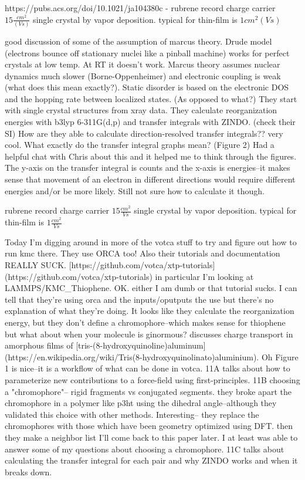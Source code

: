 \documentclass{article}
\begin{document}
https://pubs.acs.org/doi/10.1021/ja104380c - 
rubrene record charge carrier $15 \frac{cm^{2}}{(V s)}$ single crystal by vapor deposition. typical for thin-film is $1 {cm^{2}}{(V s)}$

good discussion of some of the assumption of marcus theory. 
Drude model (electrons bounce off stationary nuclei like a pinball machine) works for perfect crystals at low temp.
At RT it doesn't work. Marcus theory assumes nuclear dynamics much slower (Borne-Oppenheimer) and electronic coupling is weak (what does this mean exactly?). Static disorder is based on the electronic DOS and the hopping rate between localized states. (As opposed to what?)
They start with single crystal structures from xray data. They calculate reorganization energies with b3lyp 6-311G(d,p) and transfer integrals with ZINDO. (check their SI)
How are they able to calculate direction-resolved transfer integrals?? very cool. What exactly do the transfer integral graphs mean? (Figure 2) Had a helpful chat with Chris about this and it helped me to think through the figures. The y-axis on the transfer integral is counts and the x-axis is energies--it makes sense that movement of an electron in different directions would require different energies and/or be more likely. Still not sure how to calculate it though. 

\cite{Vehoff2010a}
rubrene record charge carrier $15 \frac{cm^{2}}{V s}$ single crystal by vapor deposition. typical for thin-film is $1 \frac{cm^{2}}{V s}$

Today I'm digging around in more of the votca stuff to try and figure out how to run kmc there. They use ORCA too! Also their tutorials and documentation REALLY SUCK. [https://github.com/votca/xtp-tutorials](https://github.com/votca/xtp-tutorials) in particular I'm looking at LAMMPS/KMC\_Thiophene.
OK. either I am dumb or that tutorial sucks. I can tell that they're using orca and the inputs/oputputs the use but there's no explanation of what they're doing. It looks like they calculate the reorganization energy, but they don't define a chromophore--which makes sense for thiophene but what about when your molecule is ginormous?
\cite{Ruhle2011b} discusses charge transport in amorphous films of [tris-(8-hydroxyquinoline)aluminum](https://en.wikipedia.org/wiki/Tris(8-hydroxyquinolinato)aluminium). Oh Figure 1 is nice--it is a workflow of what can be done in votca.
11A talks about how to parameterize new contributions to a force-field using first-principles.
11B choosing a "chromophore"-- rigid fragments vs conjugated segments. they broke apart the chromophore in a polymer like p3ht using the dihedral angle--although they validated this choice with other methods. Interesting-- they replace the chromophores with those which have been geometry optimized using DFT. then they make a neighbor list
I'll come back to this paper later. I at least was able to answer some of my questions about choosing a chromophore.
11C talks about calculating the transfer integral for each pair and why ZINDO works and when it breaks down.
\end{document}
